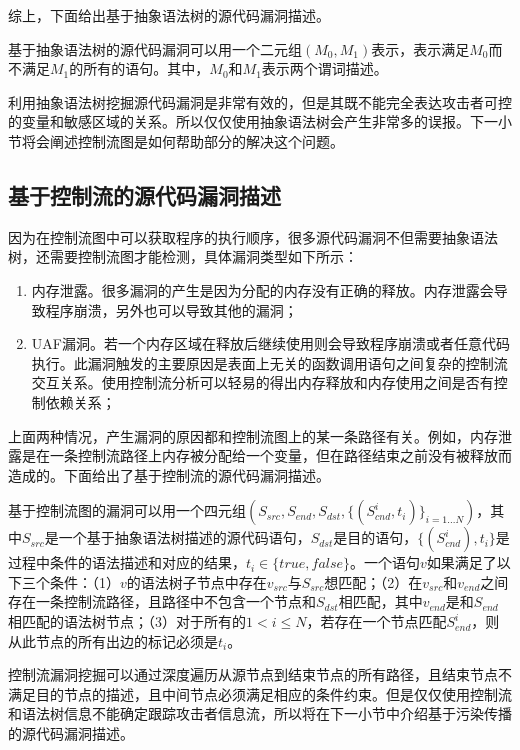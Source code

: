 综上，下面给出基于抽象语法树的源代码漏洞描述。

\begin{definition}
\label{基于抽象语法树的源代码漏洞描述}
基于抽象语法树的源代码漏洞可以用一个二元组$(M_0,M_1)$表示，表示满足$M_0$而不满足$M_1$的所有的语句。其中，$M_0$和$M_1$表示两个谓词描述。
\end{definition}

利用抽象语法树挖掘源代码漏洞是非常有效的，但是其既不能完全表达攻击者可控的变量和敏感区域的关系。所以仅仅使用抽象语法树会产生非常多的误报。下一小节将会阐述控制流图是如何帮助部分的解决这个问题。

\subsection{基于控制流的源代码漏洞描述}

因为在控制流图中可以获取程序的执行顺序，很多源代码漏洞不但需要抽象语法树，还需要控制流图才能检测，具体漏洞类型如下所示：

\begin{enumerate}[(1)]
\item 内存泄露。很多漏洞的产生是因为分配的内存没有正确的释放。内存泄露会导致程序崩溃，另外也可以导致其他的漏洞；
\item UAF漏洞。若一个内存区域在释放后继续使用则会导致程序崩溃或者任意代码执行。此漏洞触发的主要原因是表面上无关的函数调用语句之间复杂的控制流交互关系。使用控制流分析可以轻易的得出内存释放和内存使用之间是否有控制依赖关系；
\end{enumerate}
上面两种情况，产生漏洞的原因都和控制流图上的某一条路径有关。例如，内存泄露是在一条控制流路径上内存被分配给一个变量，但在路径结束之前没有被释放而造成的。下面给出了基于控制流的源代码漏洞描述。

\begin{definition}
基于控制流图的漏洞可以用一个四元组$(S_{src},S_{end},S_{dst},\{(S^{i}_{cnd},t_i)\}_{i=1...N})$，其中$S_{src}$是一个基于抽象语法树描述的源代码语句，$S_{dst}$是目的语句，$\{(S^{i}_{cnd}),t_i\}$是过程中条件的语法描述和对应的结果，$t_i \in \{true, false\}$。一个语句$v$如果满足了以下三个条件：（1）$v$的语法树子节点中存在$v_{src}$与$S_{src}$想匹配；（2）在$v_{src}$和$v_{end}$之间存在一条控制流路径，且路径中不包含一个节点和$S_{dst}$相匹配，其中$v_{end}$是和$S_{end}$相匹配的语法树节点；（3）对于所有的$1< i \leq N$，若存在一个节点匹配$S^{i}_{end}$，则从此节点的所有出边的标记必须是$t_i$。
\end{definition}

控制流漏洞挖掘可以通过深度遍历从源节点到结束节点的所有路径，且结束节点不满足目的节点的描述，且中间节点必须满足相应的条件约束。但是仅仅使用控制流和语法树信息不能确定跟踪攻击者信息流，所以将在下一小节中介绍基于污染传播的源代码漏洞描述。

